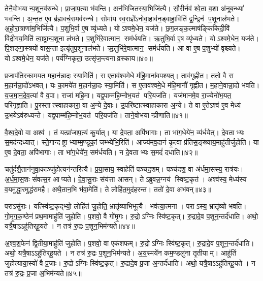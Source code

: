 तेनै॒वोभयान्प॒शूनव॑रुन्धे।
प्रा॒जा॒प॒त्या भ॑वन्ति।
अन॑भिजितस्या॒भिजि॑त्यै।
सौ॒रीर्नव॑ श्वे॒ता व॒शा अ॑नूब॒न्ध्या॑ भवन्ति।
अ॒न्त॒त ए॒व ब्र॑ह्मवर्च॒समव॑रुन्धे।
सोमा॑य स्व॒राज्ञे॑ऽनोवा॒हाव॑न॒ड्वाहा॒विति॑ द्व॒न्द्विन॑ प॒शूनाल॑भते।
अ॒हो॒रा॒त्राणा॑म॒भिजि॑त्यै।
प॒शुभि॒र्वा ए॒ष व्यृ॑ध्यते।
योऽश्वमे॒धेन॒ यज॑ते।
छ॒ग॒लङ्क॒ल्माष॑ङ्किकिदी॒विं वि॑दी॒गय॒मिति॑ त्वा॒ष्ट्रान्प॒शूना ल॑भते।
प॒शुभि॑रे॒वात्मान॒ सम॑र्धयति।
ऋ॒तुभि॒र्वा ए॒ष व्यृ॑ध्यते।
योऽश्वमे॒धेन॒ यज॑ते।
पि॒शङ्गा॒स्त्रयो॑ वास॒न्ता इत्यृ॑तुप॒शूनाल॑भते।
ऋ॒तुभि॑रे॒वात्मान॒ सम॑र्धयति।
आ वा ए॒ष प॒शुभ्यो॑ वृश्च्यते।
योऽश्वमे॒धेन॒ यज॑ते।
पर्य॑ग्निकृता॒ उत्सृ॑ज॒न्त्यनाव्रस्काय॥४०॥\anuvakamend[ल॒भ्य॒न्ते॒ ल॒भ॒ते॒ त्वा॒ष्ट्रान्प॒शूनाल॑भते॒ऽष्टौ च॑]

प्र॒जाप॑तिरकामयत म॒हान॑न्ना॒दः स्या॒मिति॑।
स ए॒ताव॑श्वमे॒धे म॑हि॒माना॑वपश्यत्।
ताव॑गृह्णीत।
ततो॒ वै स म॒हान॑न्ना॒दो॑ऽभवत्।
यः का॒मये॑त म॒हान॑न्ना॒दः स्या॒मिति॑।
स ए॒ताव॑श्वमे॒धे म॑हि॒मानौ॑ गृह्णीत।
म॒हाने॒वान्ना॒दो भ॑वति।
य॒ज॒मा॒न॒दे॒व॒त्या॑ वै व॒पा।
राजा॑ महि॒मा।
यद्व॒पाम्म॑हि॒म्नोभ॒यत॑ परि॒यज॑ति।
यज॑मानमे॒व रा॒ज्येनो॑भ॒यत॒ परि॑गृह्णाति।
पु॒रस्तात्स्वाहाकारा॒ वा अ॒न्ये दे॒वाः।
उ॒परि॑ष्टात्स्वाहाकारा अ॒न्ये।
ते वा ए॒तेऽश्व॑ ए॒व मेध्य॑ उ॒भयेऽव॑रुध्यन्ते।
यद्व॒पाम्म॑हि॒म्नोभ॒यत॑ परि॒यज॑ति।
ताने॒वोभयान्प्रीणाति॥४१॥\anuvakamend[प॒रि॒यज॑ति॒ षट्च॑]

वै॒श्व॒दे॒वो वा अश्व॑।
तं यत्प्रा॑जाप॒त्यं कु॒र्यात्।
या दे॒वता॒ अपि॑भागाः।
ता भा॑ग॒धेये॑न॒ व्य॑र्धयेत्।
दे॒वताभ्यः स॒मद॑न्दध्यात्।
स्ते॒गान्दष्ट्राभ्याम्म॒ण्डूकां॒ जम्भ्ये॑भि॒रिति॑।
आज्य॑मव॒दानं॑ कृ॒त्वा प्र॑तिस॒ङ्ख्याय॒माहु॑तीर्जुहोति।
या ए॒व दे॒वता॒ अपि॑भागाः।
ता भा॑ग॒धेये॑न॒ सम॑र्धयति।
न दे॒वताभ्यः स॒मदं॑ दधाति॥४२॥

चतु॑र्दशै॒तान॑नुवा॒काञ्जु॑हो॒त्यन॑न्तरित्यै।
प्र॒या॒साय॒ स्वाहेति॑ पञ्चद॒शम्।
पञ्च॑दश॒ वा अ॑र्धमा॒सस्य॒ रात्र॑यः।
अ॒र्ध॒मा॒स॒शः सं॑वत्स॒र आप्यते।
दे॒वा॒सु॒राः संय॑त्ता आसन्।
तेऽब्रुवन्न॒ग्नय॑ स्विष्ट॒कृत॑।
अश्व॑स्य॒ मेध्य॑स्य व॒यमु॑द्धा॒रमुद्ध॑रामहै।
अथै॒तान॒भि भ॑वा॒मेति॑।
ते लोहि॑त॒मुद॑हरन्त।
ततो॑ दे॒वा अभ॑वन्॥४३॥

पराऽसु॑राः।
यत्स्वि॑ष्ट॒कृद्भ्यो॒ लोहि॑तं जु॒होति॒ भ्रातृ॑व्याभिभूत्यै।
भव॑त्या॒त्मना।
पराऽस्य॒ भ्रातृ॑व्यो भवति।
गो॒मृ॒ग॒क॒ण्ठेन॑ प्रथ॒मामाहु॑तिं जुहोति।
प॒शवो॒ वै गो॑मृ॒गः।
रु॒द्रोऽग्निः स्वि॑ष्ट॒कृत्।
रु॒द्रादे॒व प॒शून॒न्तर्द॑धाति।
अथो॒ यत्रै॒षाऽऽहु॑तिर्‌हू॒यते।
न तत्र॑ रु॒द्रः प॒शून॒भिम॑न्यते॥४४॥

अ॒श्व॒श॒फेन॑ द्वि॒तीया॒माहु॑तिं जुहोति।
प॒शवो॒ वा एक॑शफम्।
रु॒द्रोऽग्निः स्वि॑ष्ट॒कृत्।
रु॒द्रादे॒व प॒शून॒न्तर्द॑धाति।
अथो॒ यत्रै॒षाऽऽहु॑तिर्‌हू॒यते।
न तत्र॑ रु॒द्रः प॒शून॒भिम॑न्यते।
अ॒य॒स्मये॑न कम॒ण्डलु॑ना तृ॒तीयाम्।
आहु॑तिं जुहोत्याया॒स्यो॑ वै प्र॒जाः।
रु॒द्रोऽग्निः स्वि॑ष्ट॒कृत्।
रु॒द्रादे॒व प्र॒जा अ॒न्तर्द॑धाति।
अथो॒ यत्रै॒षाऽऽहु॑तिर्‌हू॒यते।
न तत्र॑ रु॒द्रः प्र॒जा अ॒भिम॑न्यते॥४५॥\anuvakamend[द॒धा॒त्यभ॑वन्मन्यते प्र॒जा अ॒न्तर्द॑धाति॒ द्वे च॑ ]


